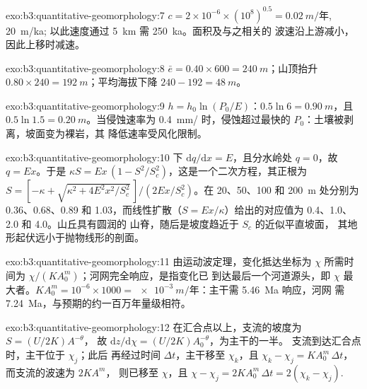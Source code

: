 \begin{solution}{exo:b3:quantitative-geomorphology:7}
$c = 2\times10^{-6}\times(10^8)^{0.5} = \qty{0.02}{m/\text{年}}$, \qty{20}{m/ka};
以此速度通过 \qty{5}{km} 需 \qty{250}{ka}。面积及与之相关的
波速沿上游减小，因此上移时减速。
\end{solution}

\begin{solution}{exo:b3:quantitative-geomorphology:8}
$\bar e = 0.40\times600 = \qty{240}{m}$；山顶抬升 $0.80\times240 =
\qty{192}{m}$；平均海拔下降 $240 - 192 = \qty{48}{m}$。
\end{solution}

\begin{solution}{exo:b3:quantitative-geomorphology:9}
$h = h_0\ln(P_0/E)$：$0.5\ln 6 = \qty{0.90}{m}$，且 $0.5\ln1.5 =
\qty{0.20}{m}$。当侵蚀速率为 \qty{0.4}{mm/} 时，侵蚀超过最快的
 $P_0$：土壤被剥离，坡面变为裸岩，其
降低速率受风化限制。
\end{solution}

\begin{solution}{exo:b3:quantitative-geomorphology:10}
下 $\mathrm{d}q/\mathrm{d}x = E$，且分水岭处 $q = 0$，故
$q = E x$。于是 $\kappa S = E x\,(1 - S^2/S_c^2)$，这是一个二次方程，其正根为
$S = [-\kappa + \sqrt{\kappa^2 + 4E^2x^2/S_c^2}\,]/(2Ex/S_c^2)$。在
20、50、100 和 \qty{200}{m} 处分别为 0.36、0.68、0.89 和 1.03，而线性扩散（$S = Ex/\kappa$）给出的对应值为 0.4、1.0、
2.0 和 4.0。山丘具有圆润的
山脊，随后是坡度趋近于 $S_c$ 的近似平直坡面，
其地形起伏远小于抛物线形的剖面。
\end{solution}

\begin{solution}{exo:b3:quantitative-geomorphology:11}
由运动波定理，变化抵达坐标为
$\chi$ 所需时间为 $\chi/(KA_0^m)$；河网完全响应，是指变化已
到达最后一个河道源头，即 $\chi$ 最大者。$K A_0^m = 10^{-6}\times
1000 = \qty{e-3}{m/\text{年}}$：主干需 \qty{5.46}{Ma} 响应，河网
需 \qty{7.24}{Ma}，与预期的约一百万年量级相符。
\end{solution}

\begin{solution}{exo:b3:quantitative-geomorphology:12}
在汇合点以上，支流的坡度为 $S = (U/2K)A^{-\theta}$，
故 $\mathrm{d}z/\mathrm{d}\chi = (U/2K)A_0^{-\theta}$，为主干的一半。
支流到达汇合点时，主干位于 $\chi_j$；此后
再经过时间 $\Delta t$，主干移至 $\chi_k$，且 $\chi_k -
\chi_j = K A_0^m\,\Delta t$，而支流的波速为 $2KA^m$，
则已移至 $\chi$，且 $\chi - \chi_j = 2KA_0^m\,\Delta t = 2(\chi_k -
\chi_j)$.
\end{solution}

